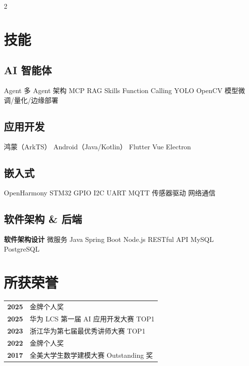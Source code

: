 \documentclass[]{deedy-resume-openfont}
\begin{document}
\begin{paracol}{2}

\section{技能}

\subsection{AI 智能体}
Agent \textbullet{} 多 Agent 架构 \textbullet{} MCP \textbullet{} RAG \textbullet{} Skills \textbullet{} Function Calling \textbullet{} YOLO \textbullet{} OpenCV \textbullet{} 模型微调/量化/边缘部署 \\
\sectionsep

\subsection{应用开发}
鸿蒙（ArkTS）\textbullet{} Android（Java/Kotlin）\textbullet{} Flutter \textbullet{} Vue \textbullet{} Electron \\
\sectionsep

\subsection{嵌入式}
OpenHarmony \textbullet{} STM32 \textbullet{} GPIO \textbullet{} I2C \textbullet{} UART \textbullet{} MQTT \textbullet{} 传感器驱动 \textbullet{} 网络通信 \\
\sectionsep

\subsection{软件架构 \& 后端}
\textbf{软件架构设计} \textbullet{} 微服务 \textbullet{} Java \textbullet{} Spring Boot \textbullet{} Node.js \textbullet{} RESTful API \textbullet{} MySQL \textbullet{} PostgreSQL \\
\sectionsep



\section{所获荣誉}

\begin{tabular}{@{}p{2em} p{\dimexpr\linewidth-2em-2\tabcolsep\relax}@{}}
\textbf{2025} & 金牌个人奖 \\[8pt]
\textbf{2025} & 华为 LCS 第一届 AI 应用开发大赛 TOP1 \\[8pt]
\textbf{2023} & 浙江华为第七届最优秀讲师大赛 TOP1 \\[8pt]
\textbf{2022} & 金牌个人奖 \\[8pt]
\textbf{2017} & 全美大学生数学建模大赛 Outstanding 奖 \\
\end{tabular}


\end{paracol}
\end{document}

